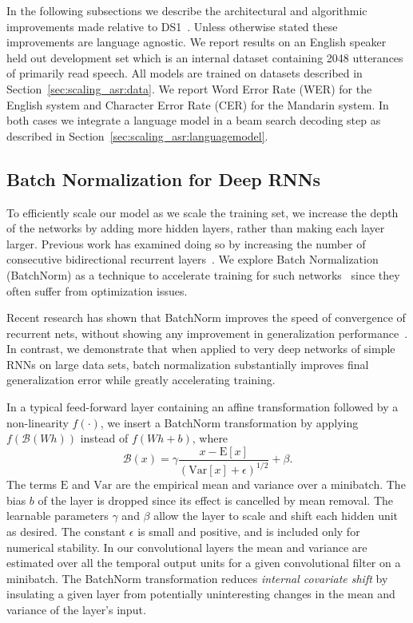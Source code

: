 In the following subsections we describe the architectural and algorithmic
improvements made relative to DS1~\cite{hannun2014deepspeech}.  Unless
otherwise stated these improvements are language agnostic. We report results on
an English speaker held out development set which is an internal dataset
containing 2048 utterances of primarily read speech. All models are trained on
datasets described in Section~\ref{sec:scaling_asr:data}. We report Word Error
Rate (WER) for the English system and Character Error Rate (CER) for the
Mandarin system. In both cases we integrate a language model in a beam search
decoding step as described in Section~\ref{sec:scaling_asr:languagemodel}.


\subsection{Batch Normalization for Deep RNNs}

To efficiently scale our model as we scale the training set, we increase the
depth of the networks by adding more hidden layers, rather than making each
layer larger. Previous work has examined doing so by increasing the number of
consecutive bidirectional recurrent layers~\cite{graves2013}. We explore Batch
Normalization (BatchNorm) as a technique to accelerate training for such
networks~\cite{ioffe2015batch} since they often suffer from optimization
issues. 

Recent research has shown that BatchNorm improves the speed of convergence of
recurrent nets, without showing any improvement in generalization
performance~\cite{laurent2016}. In contrast, we demonstrate that when applied
to very deep networks of simple RNNs on large data sets, batch normalization
substantially improves final generalization error while greatly accelerating
training. 

In a typical feed-forward layer containing an affine transformation followed by
a non-linearity $f(\cdot)$, we insert a BatchNorm transformation by applying
$f(\mathcal{B}(Wh))$ instead of $f(Wh + b)$, where
\begin{equation*}
    \mathcal{B}(x) = \gamma 
        \frac{x - \mathrm{E}[x]}{\left(\mathrm{Var}[x] + \epsilon\right)^{1/2}} + \beta.
\end{equation*}
The terms $\mathrm{E}$ and $\mathrm{Var}$ are the empirical mean and variance
over a minibatch. The bias $b$ of the layer is dropped since its effect is
cancelled by mean removal. The learnable parameters $\gamma$ and $\beta$ allow
the layer to scale and shift each hidden unit as desired. The constant
$\epsilon$ is small and positive, and is included only for numerical stability.
In our convolutional layers the mean and variance are estimated over all the
temporal output units for a given convolutional filter on a minibatch. The
BatchNorm transformation reduces \emph{internal covariate shift} by insulating
a given layer from potentially uninteresting changes in the mean and variance
of the layer's input.

